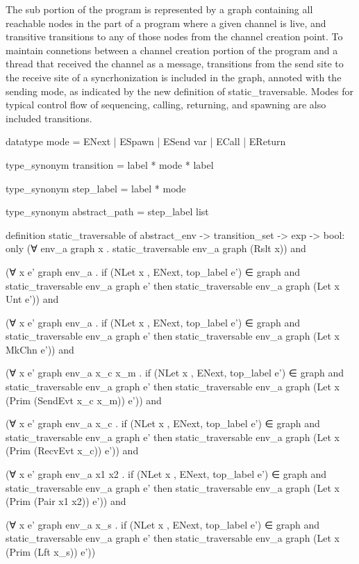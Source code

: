 The sub portion of the program is represented by a graph containing all reachable nodes in the
part of a program where a given channel is live, and transitive transitions to any of those nodes
from the channel creation point.  To maintain connetions between a channel creation portion of the
program and a thread that received the channel as a message, transitions from the send site to
the receive site of a syncrhonization is included in the graph, annoted with the sending mode, as
indicated by the new definition of static_traversable.  Modes for typical control flow of
sequencing, calling, returning, and spawning are also included transitions.

datatype mode = ENext | ESpawn | ESend var | ECall | EReturn

type_synonym transition = label * mode * label

type_synonym step_label = label * mode

type_synonym abstract_path = step_label list

definition static_traversable of abstract_env -> transition_set -> exp -> bool:
only
(∀ env_a graph x .
    static_traversable env_a graph (Rslt x)) and

(∀ x e' graph env_a  .
  if
    (NLet x , ENext, top_label e') ∈ graph and
    static_traversable env_a graph e'
  then
    static_traversable env_a graph (Let x Unt e')) and

(∀ x e' graph env_a  .
  if
    (NLet x , ENext, top_label e') ∈ graph and
    static_traversable env_a graph e'
  then
    static_traversable env_a graph (Let x MkChn e')) and


(∀ x e' graph env_a  x_c x_m .
  if
    (NLet x , ENext, top_label e') ∈ graph and
    static_traversable env_a graph e'
  then
    static_traversable env_a graph (Let x (Prim (SendEvt x_c x_m)) e')) and

(∀ x e' graph env_a x_c .
  if
    (NLet x , ENext, top_label e') ∈ graph and
    static_traversable env_a graph e'
  then
    static_traversable env_a graph (Let x (Prim (RecvEvt x_c)) e')) and


(∀ x e' graph env_a x1 x2 .
  if
    (NLet x , ENext, top_label e') ∈ graph and
    static_traversable env_a graph e'
  then
    static_traversable env_a graph (Let x (Prim (Pair x1 x2)) e')) and


(∀ x e' graph env_a x_s .
  if
    (NLet x , ENext, top_label e') ∈ graph and
    static_traversable env_a graph e'
  then
    static_traversable env_a graph (Let x (Prim (Lft x_s)) e'))


